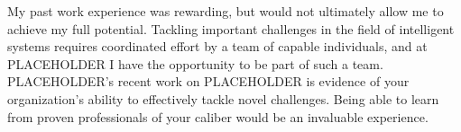 \begin{cvletter}

	My past work experience was rewarding, but would not ultimately
	allow me to achieve my full potential.
	Tackling important challenges in the field of
	intelligent systems requires coordinated effort by a team of
	capable individuals, and at PLACEHOLDER I have the opportunity to be
	part of such a team. PLACEHOLDER's recent work on PLACEHOLDER is
	evidence of your organization's ability to effectively tackle novel
	challenges. Being able to learn from proven professionals of your
	caliber would be an invaluable experience.

\end{cvletter}
